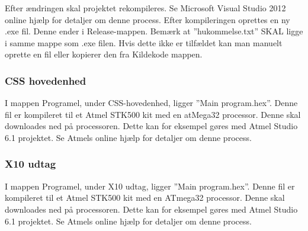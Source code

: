 Efter ændringen skal projektet rekompileres. Se Microsoft Visual Studio 2012 online hjælp for detaljer om denne process. Efter kompileringen oprettes en ny .exe fil. Denne ender i Release-mappen. Bemærk at ''hukommelse.txt'' SKAL ligge i samme mappe som .exe filen. Hvis dette ikke er tilfældet kan man manuelt oprette en fil eller kopierer den fra Kildekode mappen.

\subsubsection{CSS hovedenhed}
I mappen Programel, under CSS-hovedenhed, ligger ''Main program.hex''. Denne fil er kompileret til et Atmel STK500 kit med en atMega32 processor. Denne skal downloades ned på processoren. Dette kan for eksempel gøres med Atmel Studio 6.1 projektet. Se Atmels online hjælp for detaljer om denne process.

\subsubsection{X10 udtag}
I mappen Programel, under X10 udtag, ligger ''Main program.hex''. Denne fil er kompileret til et Atmel STK500 kit med en ATmega32 processor. Denne skal downloades ned på processoren. Dette kan for eksempel gøres med Atmel Studio 6.1 projektet. Se Atmels online hjælp for detaljer om denne process.
